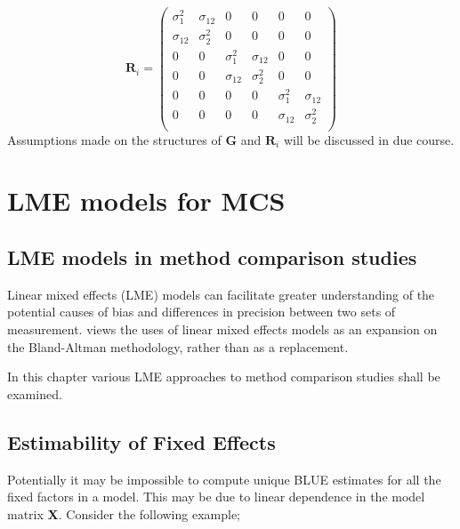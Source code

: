 \documentclass[12pt, a4paper]{report}
\theoremstyle{plain}
\theoremstyle{definition}
\theoremstyle{remark}
\begin{document}
	\[
	\boldsymbol{R}_i = \left(
	\begin{array}{cccccc}
	\sigma^2_{1} & \sigma_{12} & 0 & 0 & 0 & 0 \\
	\sigma_{12} & \sigma^2_{2} & 0 & 0 & 0 & 0 \\
	0 & 0 & \sigma^2_{1} & \sigma_{12} & 0 & 0 \\
	0 & 0 & \sigma_{12} & \sigma^2_{2} & 0 & 0 \\
	0 & 0 & 0 & 0 & \sigma^2_{1} & \sigma_{12} \\
	0 & 0 & 0 & 0 & \sigma_{12} & \sigma^2_{2} \\
	\end{array} \right)
	\]
	Assumptions made on the structures of $\boldsymbol{G}$ and $\boldsymbol{R}_i$ will be discussed in due course.
	
	
	
	
	\section{LME models for MCS}
	
	\subsection{LME models in method comparison studies}
	
	Linear mixed effects (LME) models can facilitate greater
	understanding of the potential causes of bias and differences in
	precision between two sets of measurement. \citet{LaiShiao} views
	the uses of linear mixed effects models as an expansion on the
	Bland-Altman methodology, rather than as a replacement.
	
	In this
	chapter various LME approaches to method comparison studies shall
	be examined.
	
	
	
	
	
	
	
	
	
	
	
	
	\subsection{Estimability of Fixed Effects}
	Potentially it may be impossible to compute unique BLUE estimates for all the fixed factors in a model. This may be due to linear dependence in the model
	matrix \textbf{X}. Consider the following example;
	
\end{document}
